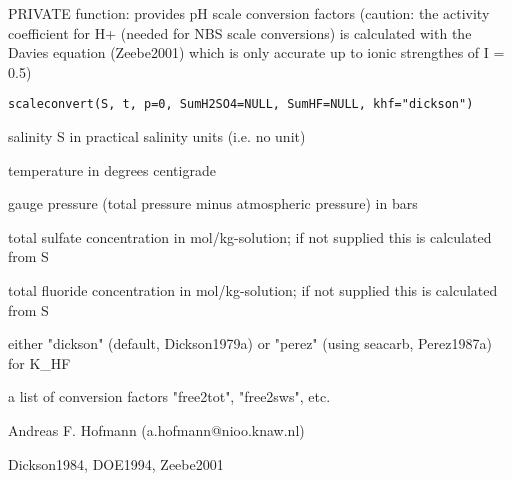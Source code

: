 \documentclass{article}
\begin{document}
\begin{Description}\relax
PRIVATE function: provides pH scale conversion factors (caution: the activity coefficient for H+ (needed for NBS scale conversions) is calculated with the Davies equation (Zeebe2001) which is only accurate up to ionic strengthes of I = 0.5)
\end{Description}
\begin{Usage}
\begin{verbatim}scaleconvert(S, t, p=0, SumH2SO4=NULL, SumHF=NULL, khf="dickson")\end{verbatim}
\end{Usage}
\begin{Arguments}
\begin{ldescription}
\item[\code{S }] salinity S in practical salinity units (i.e. no unit)
\item[\code{t }] temperature in degrees centigrade
\item[\code{p }] gauge pressure (total pressure minus atmospheric pressure) in bars
\item[\code{SumH2SO4 }] total sulfate concentration in mol/kg-solution; if not supplied this is calculated from S
\item[\code{SumHF }] total fluoride concentration in mol/kg-solution; if not
supplied this is calculated from S
\item[\code{khf}] either "dickson" (default, Dickson1979a) or "perez" (using seacarb, Perez1987a) for K\_HF
\end{ldescription}
\end{Arguments}
\begin{Value}
a list of conversion factors "free2tot", "free2sws", etc.
\end{Value}
\begin{Author}\relax
Andreas F. Hofmann (a.hofmann@nioo.knaw.nl)
\end{Author}
\begin{References}\relax
Dickson1984, DOE1994, Zeebe2001
\end{References}
\end{document}
